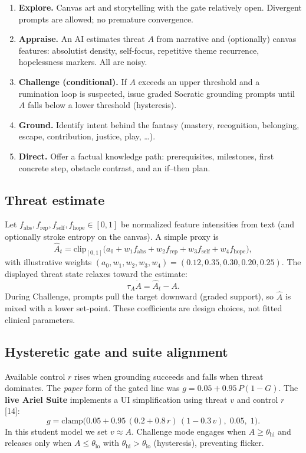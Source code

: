 \documentclass[11pt, a4paper]{article}
\begin{document}
\begin{enumerate}[leftmargin=1.4em]
  \item \textbf{Explore.} Canvas art and storytelling with the gate relatively open. Divergent prompts are allowed; no premature convergence.
  \item \textbf{Appraise.} An AI estimates threat $A$ from narrative and (optionally) canvas features: absolutist density, self-focus, repetitive theme recurrence, hopelessness markers. All are noisy.
  \item \textbf{Challenge (conditional).} If $A$ exceeds an upper threshold and a rumination loop is suspected, issue graded Socratic grounding prompts until $A$ falls below a lower threshold (hysteresis).
  \item \textbf{Ground.} Identify intent behind the fantasy (mastery, recognition, belonging, escape, contribution, justice, play, \ldots).
  \item \textbf{Direct.} Offer a factual knowledge path: prerequisites, milestones, first concrete step, obstacle contrast, and an if--then plan.
\end{enumerate}

\subsection{Threat estimate}
Let $f_{\mathrm{abs}}, f_{\mathrm{rep}}, f_{\mathrm{self}}, f_{\mathrm{hope}}\in[0,1]$ be normalized feature intensities from text (and optionally stroke entropy on the canvas). A simple proxy is
\begin{equation}
\hat{A}_t = \mathrm{clip}_{[0,1]}\!\Big(a_0 + w_1 f_{\mathrm{abs}} + w_2 f_{\mathrm{rep}} + w_3 f_{\mathrm{self}} + w_4 f_{\mathrm{hope}}\Big),
\end{equation}
with illustrative weights $(a_0,w_1,w_2,w_3,w_4)=(0.12,0.35,0.30,0.20,0.25)$. The displayed threat state relaxes toward the estimate:
\begin{equation}
\tau_A \dot{A} = \hat{A}_t - A.
\end{equation}
During Challenge, prompts pull the target downward (graded support), so $\hat{A}$ is mixed with a lower set-point. These coefficients are design choices, not fitted clinical parameters.

\subsection{Hysteretic gate and suite alignment}
Available control $r$ rises when grounding succeeds and falls when threat dominates. The \emph{paper} form of the gated line was $g=0.05+0.95\,P(1-G)$. The \textbf{live Ariel Suite} implements a UI simplification using threat $v$ and control $r$ [14]:
\begin{equation}
g=\mathrm{clamp}\!\big(0.05 + 0.95\,(0.2+0.8\,r)\,(1-0.3\,v),\;0.05,\;1\big).
\end{equation}
In this student model we set $v\approx A$. Challenge mode engages when $A\ge\theta_{\mathrm{hi}}$ and releases only when $A\le\theta_{\mathrm{lo}}$ with $\theta_{\mathrm{hi}}>\theta_{\mathrm{lo}}$ (hysteresis), preventing flicker.
\end{document}
